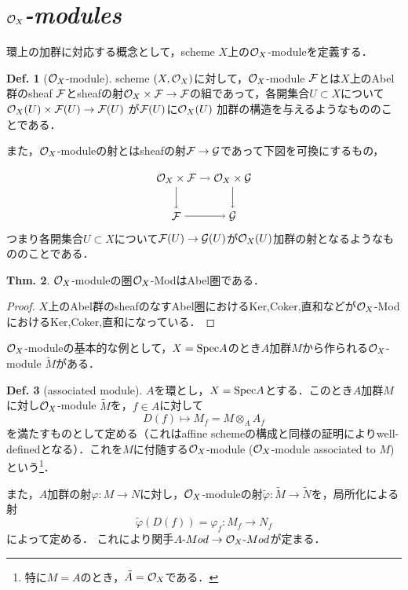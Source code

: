 \documentclass[dvipdfmx,b5paper,papersize]{jsarticle}
\theoremstyle{definition}
\newtheorem{thm}{Thm.}
\newtheorem{defi}[thm]{Def.}
\begin{document}
\section{${\cal{O}}_{X}$\it{-modules}}
環上の加群に対応する概念として，scheme $X$上の${\cal{O}}_{X}$-moduleを定義する．
\begin{defi}[${\cal{O}}_X$-module]
  scheme $(X,{\cal{O}}_X)$に対して，${\cal{O}}_X$-module $\cal{F}$とは$X$上のAbel群のsheaf $\cal{F}$とsheafの射${\cal{O}}_X \times \cal{F} \to \cal{F}$の組であって，各開集合$U \subset X$について${\cal{O}}_X(U)\times{\cal{F}}(U)\to{\cal{F}}(U)$
  が${\cal{F}}(U)$に${\cal{O}}_X(U)$
  加群の構造を与えるようなもののことである．

  また，${\cal{O}}_X$-moduleの射とはsheafの射$\cal{F} \to \cal{G}$であって下図を可換にするもの，

  \[
    \begin{tikzpicture}[auto,->]
      \node (a) at (0,1.2) {${\cal{O}}_X \times \cal{F}$}; \node (x) at (1.8,1.2) {${\cal{O}}_X \times \cal{G}$};
      \node (b) at (0,0) {$\cal{F}$}; \node (y) at (1.8,0) {$\cal{G}$};
      \draw (a) -- node {$\scriptstyle $} (x);
      \draw (x) -- node {$\scriptstyle $} (y);
      \draw (a) -- node[swap] {$\scriptstyle $} (b);
      \draw (b) -- node[swap] {$\scriptstyle $} (y);
    \end{tikzpicture}
  \]
  つまり各開集合$U \subset X$について${\cal{F}}(U) \to {\cal{G}}(U)$が${{\cal{O}}_X}(U)$加群の射となるようなもののことである．

\end{defi}


\begin{thm}
  ${\cal{O}}_X$-moduleの圏${\cal{O}}_X$-ModはAbel圏である．
\end{thm}

\begin{proof}
  $X$上のAbel群のsheafのなすAbel圏におけるKer,Coker,直和などが${\cal{O}}_X$-ModにおけるKer,Coker,直和になっている．

\end{proof}
${\cal{O}}_{X}$-moduleの基本的な例として，$X={\rm Spec}A$のとき$A$加群$M$から作られる${\cal{O}}_{X}$-module ${\tilde M}$がある．
\begin{defi}[associated module]
  $A$を環とし，$X={\rm Spec}A$とする．このとき$A$加群$M$に対し${\cal{O}}_X$-module ${\tilde M}$を，$f \in A$に対して
  \[
    D(f) \longmapsto M_f=M \otimes _A A_f
  \]
  を満たすものとして定める（これはaffine schemeの構成と同様の証明によりwell-definedとなる）．これを$M$に付随する${\cal{O}}_X$-module (${\cal{O}}_X$-module associated to $M$)という\footnote{特に$M=A$のとき，${\tilde A}={\cal{O}}_X$である．}．

  また，$A$加群の射$\varphi :M \to N$に対し，${\cal{O}}_X$-moduleの射${\tilde \varphi :\tilde M \to \tilde N}$を，局所化による射
  \[
    \tilde \varphi (D(f)) = \varphi _f : M_f \to N_f
  \]
  によって定める．
  これにより関手$A\mathchar`-Mod \to {\cal{O}}_{X}\mathchar`-Mod$が定まる．
\end{defi}
\end{document}
